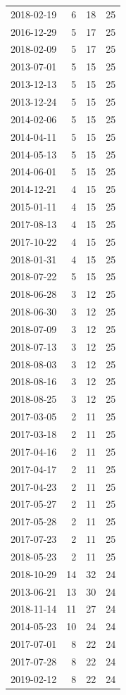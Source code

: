 \begin{tabular}{lrrr}
2018-02-19 & 6 & 18 & 25 \\
2016-12-29 & 5 & 17 & 25 \\
2018-02-09 & 5 & 17 & 25 \\
2013-07-01 & 5 & 15 & 25 \\
2013-12-13 & 5 & 15 & 25 \\
2013-12-24 & 5 & 15 & 25 \\
2014-02-06 & 5 & 15 & 25 \\
2014-04-11 & 5 & 15 & 25 \\
2014-05-13 & 5 & 15 & 25 \\
2014-06-01 & 5 & 15 & 25 \\
2014-12-21 & 4 & 15 & 25 \\
2015-01-11 & 4 & 15 & 25 \\
2017-08-13 & 4 & 15 & 25 \\
2017-10-22 & 4 & 15 & 25 \\
2018-01-31 & 4 & 15 & 25 \\
2018-07-22 & 5 & 15 & 25 \\
2018-06-28 & 3 & 12 & 25 \\
2018-06-30 & 3 & 12 & 25 \\
2018-07-09 & 3 & 12 & 25 \\
2018-07-13 & 3 & 12 & 25 \\
2018-08-03 & 3 & 12 & 25 \\
2018-08-16 & 3 & 12 & 25 \\
2018-08-25 & 3 & 12 & 25 \\
2017-03-05 & 2 & 11 & 25 \\
2017-03-18 & 2 & 11 & 25 \\
2017-04-16 & 2 & 11 & 25 \\
2017-04-17 & 2 & 11 & 25 \\
2017-04-23 & 2 & 11 & 25 \\
2017-05-27 & 2 & 11 & 25 \\
2017-05-28 & 2 & 11 & 25 \\
2017-07-23 & 2 & 11 & 25 \\
2018-05-23 & 2 & 11 & 25 \\
2018-10-29 & 14 & 32 & 24 \\
2013-06-21 & 13 & 30 & 24 \\
2018-11-14 & 11 & 27 & 24 \\
2014-05-23 & 10 & 24 & 24 \\
2017-07-01 & 8 & 22 & 24 \\
2017-07-28 & 8 & 22 & 24 \\
2019-02-12 & 8 & 22 & 24 \\

\end{tabular}
